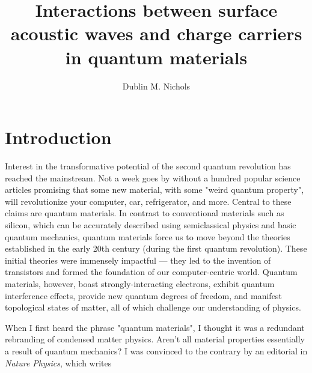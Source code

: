 \documentclass[double,12pt,1in]{beavtex}
\title{Interactions between surface acoustic waves and charge carriers in quantum materials}
\author{Dublin M. Nichols}
\begin{document}
\maketitle
\mainmatter


\chapter{Introduction}
Interest in the transformative potential of the second quantum revolution has reached the mainstream. Not a week goes by without a hundred popular science articles promising that some new material, with some "weird quantum property", will revolutionize your computer, car, refrigerator, and more. Central to these claims are quantum materials. In contrast to conventional materials such as silicon, which can be accurately described using semiclassical physics and basic quantum mechanics, quantum materials force us to move beyond the theories established in the early 20th century (during the first quantum revolution). These initial theories were immensely impactful — they led to the invention of transistors and formed the foundation of our computer-centric world. Quantum materials, however, boast strongly-interacting electrons, exhibit quantum interference effects, provide new quantum degrees of freedom, and manifest topological states of matter, all of which challenge our understanding of physics. 

When I first heard the phrase "quantum materials", I thought it was a redundant rebranding of condensed matter physics. Aren't all material properties essentially a result of quantum mechanics? I was convinced to the contrary by an editorial in \textit{Nature Physics}, which writes
\end{document}
